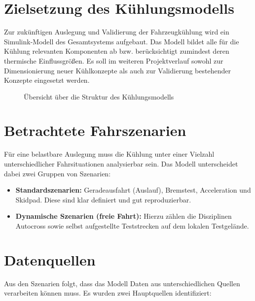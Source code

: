 \section{Zielsetzung des Kühlungsmodells}
\label{sec:modell_ziel}

Zur zukünftigen Auslegung und Validierung der Fahrzeugkühlung wird ein
Simulink-Modell des Gesamtsystems aufgebaut. Das Modell bildet alle für die
Kühlung relevanten Komponenten ab bzw. berücksichtigt zumindest deren
thermische Einflussgrößen. Es soll im weiteren Projektverlauf sowohl zur
Dimensionierung neuer Kühlkonzepte als auch zur Validierung bestehender
Konzepte eingesetzt werden.

\begin{figure}[htbp]
    \centering
    \caption{Übersicht über die Struktur des Kühlungsmodells}
    \label{fig:modell_uebersicht}
\end{figure}

\section{Betrachtete Fahrszenarien}
\label{sec:fahrszenarien}

Für eine belastbare Auslegung muss die Kühlung unter einer Vielzahl
unterschiedlicher Fahrsituationen analysierbar sein. Das Modell unterscheidet
dabei zwei Gruppen von Szenarien:

\begin{itemize}
    \item \textbf{Standardszenarien:} Geradeausfahrt (Auslauf), Bremstest,
          Acceleration und Skidpad. Diese sind klar definiert und gut
          reproduzierbar.
    \item \textbf{Dynamische Szenarien (freie Fahrt):} Hierzu zählen die
          Disziplinen Autocross sowie selbst aufgestellte Teststrecken auf
          dem lokalen Testgelände.
\end{itemize}

\section{Datenquellen}
\label{sec:datenquellen}

Aus den Szenarien folgt, dass das Modell Daten aus unterschiedlichen Quellen
verarbeiten können muss. Es wurden zwei Hauptquellen identifiziert:

